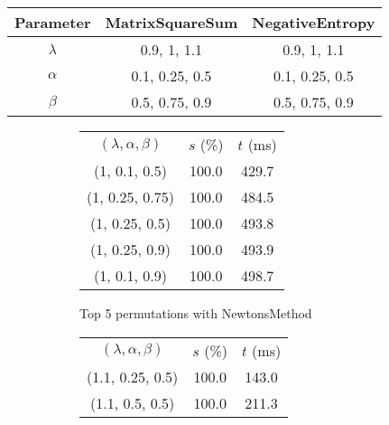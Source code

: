 \begin{center}
\label{tab:params_ArmijoSearch}
\begin{tabular}{|c|c|c|}
\hline
\rowcolor{gray!25}
Parameter & MatrixSquareSum & NegativeEntropy \\
\hline
$\lambda$ & 0.9, 1, 1.1 & 0.9, 1, 1.1 \\
$\alpha$ & 0.1, 0.25, 0.5 & 0.1, 0.25, 0.5 \\
$\beta$ & 0.5, 0.75, 0.9 & 0.5, 0.75, 0.9 \\
\hline
\end{tabular}
\end{center}

\begin{figure}[H]
\label{fig:param_comp_MatrixSquareSum_ArmijoSearch}
\begin{subfigure}[ht]{.5\textwidth}
\begin{tabular}{|c|c|c|}
\hline
\rowcolor{gray!25}
\multicolumn{3}{|c|}{NewtonsMethod} \\
\hline
\rowcolor{gray!25}
$(\lambda,\alpha,\beta)$ & $s$ (\%) & $t$ (ms) \\
\hline
(1, 0.1, 0.5) & 100.0 & 429.7 \\
(1, 0.25, 0.75) & 100.0 & 484.5 \\
(1, 0.25, 0.5) & 100.0 & 493.8 \\
(1, 0.25, 0.9) & 100.0 & 493.9 \\
(1, 0.1, 0.9) & 100.0 & 498.7 \\
\hline
\end{tabular}
\caption{Top 5 permutations with NewtonsMethod}
\label{subfig:param_comp_MatrixSquareSum_NewtonsMethod_ArmijoSearch}
\end{subfigure}
\hfill
\begin{subfigure}[ht]{.5\textwidth}
\begin{tabular}{|c|c|c|}
\hline
\rowcolor{gray!25}
\multicolumn{3}{|c|}{GradientDescentMethod} \\
\hline
\rowcolor{gray!25}
$(\lambda,\alpha,\beta)$ & $s$ (\%) & $t$ (ms) \\
\hline
(1.1, 0.25, 0.5) & 100.0 & 143.0 \\
(1.1, 0.5, 0.5) & 100.0 & 211.3 \\

\end{tabular}
\end{subfigure}
\end{figure}
